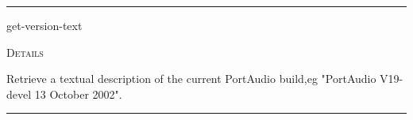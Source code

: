 \documentclass[a4paper]{report}
\begin{document}
  

    \rule{\linewidth}{0.1mm}
    
    \label{portaudio__fun__get-version-text}
    \begin{defun}[Function]
    get-version-text


	
    \bigskip
    \textsc{Details}

Retrieve a textual description of the current PortAudio build,eg "PortAudio V19-devel 13 October 2002".


    
    \end{defun}
  
  

    \rule{\linewidth}{0.1mm}
    
    \label{portaudio__fun__host-api-device-index-to-device-index}
\end{document}

